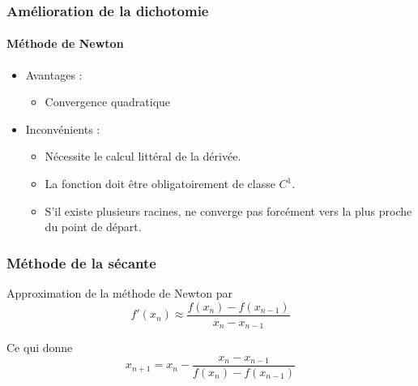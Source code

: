 
\begin{frame}
\frametitle{Amélioration de la dichotomie}
\framesubtitle{Méthode de Newton}

   \begin{itemize}
      \item Avantages :
         \begin{itemize}
            \item Convergence quadratique
         \end{itemize}
      \item Inconvénients :
      \begin{itemize}
         \item Nécessite le calcul littéral de la dérivée.
         \item La fonction doit être obligatoirement de classe $C^1$.
         \item S'il existe plusieurs racines, ne converge pas forcément vers la plus proche du point de départ.
      \end{itemize}
   \end{itemize}
\end{frame}




\begin{frame}
\frametitle{Méthode de la sécante}


Approximation de la méthode de Newton par
    \begin{equation}    
f'(x_n) \approx  \frac{f(x_{n}) - f(x_{n-1})}{x_{n}-x_{n-1}}        
    \end{equation}  
     
 
Ce qui donne
     \begin{equation}
        x_{n+1} = x_n - \frac{x_n - x_{n-1}}{f(x_n) - f(x_{n-1})}
     \end{equation}

\end{frame}






